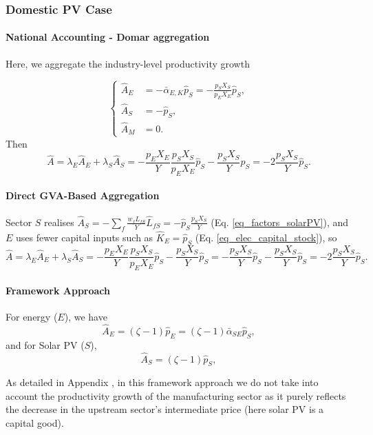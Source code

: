\documentclass[11pt]{article}
\begin{document}
\subsubsection{Domestic PV Case}

\paragraph{National Accounting - Domar aggregation} Here, we aggregate the industry-level productivity growth 

\begin{equation*}
    \begin{cases}
\hat{A}_E&=-\bar{\alpha}_{E,K}\hat{p}_S=-\frac{p_SX_S}{p_EX_E}\hat{p}_S,\\
\hat{A}_S&=-\hat{p}_S,\\
\hat{A}_M&=0.
\end{cases}
\end{equation*}
Then
\[
\hat{A}=\lambda_E\hat{A}_E+\lambda_S\hat{A}_S
=-\frac{p_EX_E}{Y}\frac{p_SX_S}{p_EX_E}\hat{p}_S-\frac{p_SX_S}{Y}\hat{p}_S
=-2\frac{p_SX_S}{Y}\hat{p}_S.
\]


\paragraph{Direct GVA-Based Aggregation}

Sector $S$ realises $\hat{A}_S=-\sum_{f} \frac{w_fL_{fS}}{Y}\hat{L}_{fS}=-\hat{p}_S\frac{p_SX_S}{Y}$ (Eq. \ref{eq_factors_solarPV}), and $E$ uses fewer capital inputs such as $\hat{K}_E=\hat{p}_S$ (Eq. \ref{eq_elec_capital_stock}), so
\begin{equation}
    \hat{A} =\lambda_E\hat{A}_E+\lambda_S\hat{A}_S=-\frac{p_EX_E}{Y}\frac{p_SX_S}{p_EX_E}\hat{p}_S-\frac{p_SX_S}{Y} \hat{p}_{S}
    =
    -\frac{p_SX_S}{Y}\hat{p}_S-\frac{p_SX_S}{Y} \hat{p}_{S}=-2\frac{p_SX_S}{Y} \hat{p}_{S}.
\end{equation}

\paragraph{Framework Approach}
For energy ($E$), we have
\[
\hat{A}_E=(\zeta-1)\hat{p}_E=(\zeta-1)\bar{\alpha}_{SE}\hat{p}_S,
\]
and for Solar PV ($S$),
\[
\hat{A}_S=(\zeta-1)\hat{p}_S,
\]

As detailed in Appendix , in this framework approach we do not take into account the productivity growth of the manufacturing sector as it purely reflects the decrease in the upstream sector's intermediate price (here solar PV is a capital good).
\end{document}
